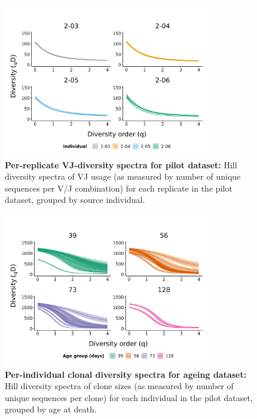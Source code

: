 \begin{figure}
\centering
\includegraphics[width = 0.8\textwidth]{_Figures/png/pilot-vj-diversity-solo-spectra}
\caption[Per-replicate VJ-diversity spectra for pilot dataset]{\textbf{Per-replicate VJ-diversity spectra for pilot dataset:} Hill diversity spectra of VJ usage (as measured by number of unique sequences per V/J combination) for each replicate in the \igseq pilot dataset, grouped by source individual.}
\label{fig:igseq-pilot-vj-diversity-solo-spectra}
\end{figure}

\begin{figure}
\centering
\includegraphics[width = 0.8\textwidth]{_Figures/png/ageing-clone-diversity-solo-spectra}
\caption[Per-individual clonal diversity spectra for ageing dataset]{\textbf{Per-individual clonal diversity spectra for ageing dataset:} Hill diversity spectra of clone sizes (as measured by number of unique sequences per clone) for each individual in the \igseq pilot dataset, grouped by age at death.}
\label{fig:igseq-ageing-clone-diversity-solo-spectra}
\end{figure}

